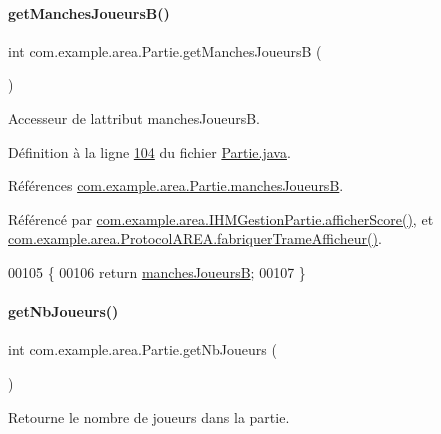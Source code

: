 \paragraph{\texorpdfstring{get\+Manches\+Joueurs\+B()}{getManchesJoueursB()}}
{\footnotesize\ttfamily int com.\+example.\+area.\+Partie.\+get\+Manches\+JoueursB (\begin{DoxyParamCaption}{ }\end{DoxyParamCaption})}



Accesseur de l\textquotesingle{}attribut manches\+JoueursB. 



Définition à la ligne \hyperlink{_partie_8java_source_l00104}{104} du fichier \hyperlink{_partie_8java_source}{Partie.\+java}.



Références \hyperlink{_partie_8java_source_l00042}{com.\+example.\+area.\+Partie.\+manches\+JoueursB}.



Référencé par \hyperlink{_i_h_m_gestion_partie_8java_source_l00435}{com.\+example.\+area.\+I\+H\+M\+Gestion\+Partie.\+afficher\+Score()}, et \hyperlink{_protocol_a_r_e_a_8java_source_l00048}{com.\+example.\+area.\+Protocol\+A\+R\+E\+A.\+fabriquer\+Trame\+Afficheur()}.


\begin{DoxyCode}
00105     \{
00106         \textcolor{keywordflow}{return} \hyperlink{classcom_1_1example_1_1area_1_1_partie_a9bb9a60be0b966b5a8bd5ac0934387bf}{manchesJoueursB};
00107     \}
\end{DoxyCode}
\mbox{\label{classcom_1_1example_1_1area_1_1_partie_a70ddc06f598fa7ffb00c315fc9490647}} 
\paragraph{\texorpdfstring{get\+Nb\+Joueurs()}{getNbJoueurs()}}
{\footnotesize\ttfamily int com.\+example.\+area.\+Partie.\+get\+Nb\+Joueurs (\begin{DoxyParamCaption}{ }\end{DoxyParamCaption})}



Retourne le nombre de joueurs dans la partie. 



